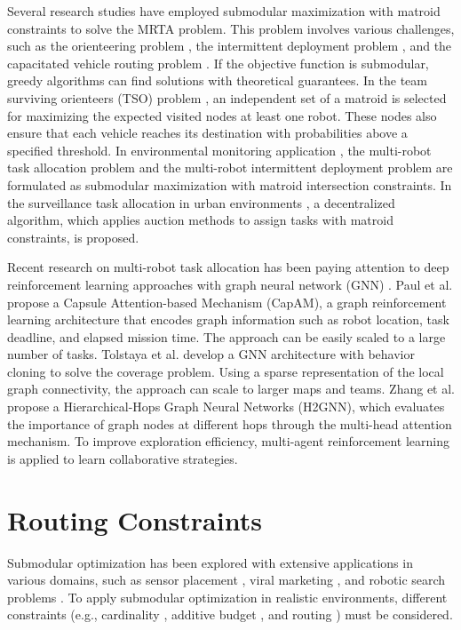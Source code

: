 Several research studies have employed submodular maximization with matroid constraints to solve the MRTA problem. This problem involves various challenges, such as the orienteering problem \cite{gunawan2016orienteering}, the intermittent deployment problem \cite{liu2018optimal}, and the capacitated vehicle routing problem \cite{ralphs2003capacitated}.
If the objective function is submodular, greedy algorithms can find solutions with theoretical guarantees\cite{nemhauser1978analysis}.
In the team surviving orienteers (TSO) problem \cite{jorgensen2017matroid},
an independent set of a matroid is selected for maximizing the expected visited nodes at least one robot.
These nodes also ensure that each vehicle reaches its destination with probabilities above a specified threshold.
In environmental monitoring application \cite{liu2019submodular}, the multi-robot task allocation problem and the multi-robot intermittent deployment problem are formulated as submodular maximization with matroid intersection constraints.
In the surveillance task allocation in urban environments \cite{williams2017decentralized}, a decentralized algorithm, which applies auction methods to assign tasks with matroid constraints, is proposed.

Recent research on multi-robot task allocation has been paying attention to deep reinforcement learning approaches with graph neural network (GNN) \cite{tolstaya2021multi}.
Paul et al. \cite{paull2022learning} propose a Capsule Attention-based Mechanism (CapAM), a graph reinforcement learning architecture that encodes graph information such as robot location, task deadline, and elapsed mission time. The approach can be easily scaled to a large number of tasks.
Tolstaya et al. \cite{tolstaya2021multi} develop a GNN architecture with behavior cloning to solve the coverage problem. Using a sparse representation of the local graph connectivity, the approach can scale to larger maps and teams.
Zhang et al. \cite{zhang2022h2gnn} propose a Hierarchical-Hops Graph Neural Networks (H2GNN), which evaluates the importance of graph nodes at different hops through the multi-head attention mechanism. To improve exploration efficiency, multi-agent reinforcement learning is applied to learn collaborative strategies.


\section{Routing Constraints}
Submodular optimization has been explored with extensive applications in various domains, such as sensor placement \cite{krause2007near}, viral marketing \cite{golovin2011adaptive}, and robotic search problems \cite{Tsai2019spatial}.
To apply submodular optimization in realistic environments, different constraints (e.g., cardinality \cite{nemhauser1978analysis}, additive budget \cite{khuller1999budgeted}, and routing \cite{zhang2016submodular}) must be considered.

